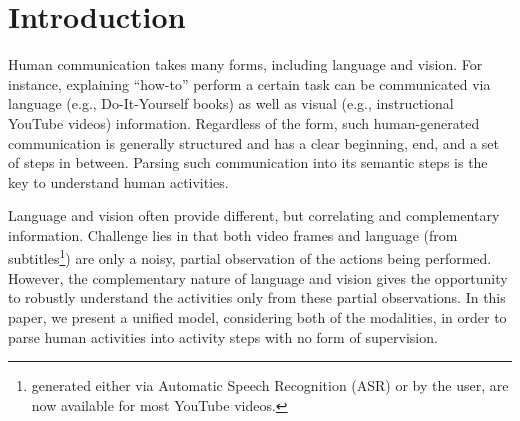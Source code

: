 
\section{Introduction}
Human communication takes many forms, including language and vision. For instance, explaining ``how-to'' perform a certain task can be communicated via language (e.g., Do-It-Yourself books) as well as visual (e.g., instructional YouTube videos) information. Regardless of the form, such human-generated communication is generally structured and has a clear beginning, end, and a set of steps in between. Parsing such communication into its semantic steps is the key to understand human activities. 




%
Language and vision often provide different, but correlating and complementary information. Challenge lies in that both video frames and language (from subtitles\footnote{generated either via Automatic Speech Recognition (ASR) or by the user, are now available for most YouTube videos.}) are only a noisy, partial observation of the actions being performed. However, the complementary nature of language and vision gives the opportunity to robustly understand the activities only from these partial observations. In this paper, we present a unified model, considering both of the modalities, in order to parse human activities into activity steps with no form of supervision.

%




